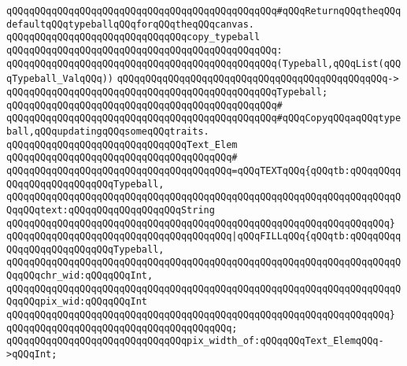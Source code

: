 \verb|qQQqqQQqqQQqqQQqqQQqqQQqqQQqqQQqqQQqqQQqqQQqqQQq#qQQqReturnqQQqtheqQQqdefaultqQQqtypeballqQQqforqQQqtheqQQqcanvas.|\newline
\newline
\verb|qQQqqQQqqQQqqQQqqQQqqQQqqQQqqQQqcopy_typeball|\newline
\verb|qQQqqQQqqQQqqQQqqQQqqQQqqQQqqQQqqQQqqQQqqQQqqQQq:|\newline
\verb|qQQqqQQqqQQqqQQqqQQqqQQqqQQqqQQqqQQqqQQqqQQqqQQq(Typeball,qQQqList(qQQqTypeball_ValqQQq))|\newline
\verb|qQQqqQQqqQQqqQQqqQQqqQQqqQQqqQQqqQQqqQQqqQQqqQQq->|\newline
\verb|qQQqqQQqqQQqqQQqqQQqqQQqqQQqqQQqqQQqqQQqqQQqqQQqTypeball;|\newline
\verb|qQQqqQQqqQQqqQQqqQQqqQQqqQQqqQQqqQQqqQQqqQQqqQQq#|\newline
\verb|qQQqqQQqqQQqqQQqqQQqqQQqqQQqqQQqqQQqqQQqqQQqqQQq#qQQqCopyqQQqaqQQqtypeball,qQQqupdatingqQQqsomeqQQqtraits.|\newline
\newline
\verb|qQQqqQQqqQQqqQQqqQQqqQQqqQQqqQQqText_Elem|\newline
\verb|qQQqqQQqqQQqqQQqqQQqqQQqqQQqqQQqqQQqqQQq#|\newline
\verb|qQQqqQQqqQQqqQQqqQQqqQQqqQQqqQQqqQQqqQQq=qQQqTEXTqQQq{qQQqtb:qQQqqQQqqQQqqQQqqQQqqQQqqQQqTypeball,|\newline
\verb|qQQqqQQqqQQqqQQqqQQqqQQqqQQqqQQqqQQqqQQqqQQqqQQqqQQqqQQqqQQqqQQqqQQqqQQqqQQqtext:qQQqqQQqqQQqqQQqqQQqString|\newline
\verb|qQQqqQQqqQQqqQQqqQQqqQQqqQQqqQQqqQQqqQQqqQQqqQQqqQQqqQQqqQQqqQQqqQQq}|\newline
\verb|qQQqqQQqqQQqqQQqqQQqqQQqqQQqqQQqqQQqqQQq|\verb#|qQQqFILLqQQq{qQQqtb:qQQqqQQqqQQqqQQqqQQqqQQqqQQqTypeball,#\newline
\verb|qQQqqQQqqQQqqQQqqQQqqQQqqQQqqQQqqQQqqQQqqQQqqQQqqQQqqQQqqQQqqQQqqQQqqQQqqQQqchr_wid:qQQqqQQqInt,|\newline
\verb|qQQqqQQqqQQqqQQqqQQqqQQqqQQqqQQqqQQqqQQqqQQqqQQqqQQqqQQqqQQqqQQqqQQqqQQqqQQqpix_wid:qQQqqQQqInt|\newline
\verb|qQQqqQQqqQQqqQQqqQQqqQQqqQQqqQQqqQQqqQQqqQQqqQQqqQQqqQQqqQQqqQQqqQQq}|\newline
\verb|qQQqqQQqqQQqqQQqqQQqqQQqqQQqqQQqqQQqqQQq;|\newline
\newline
\verb|qQQqqQQqqQQqqQQqqQQqqQQqqQQqqQQqpix_width_of:qQQqqQQqText_ElemqQQq->qQQqInt;|\newline
